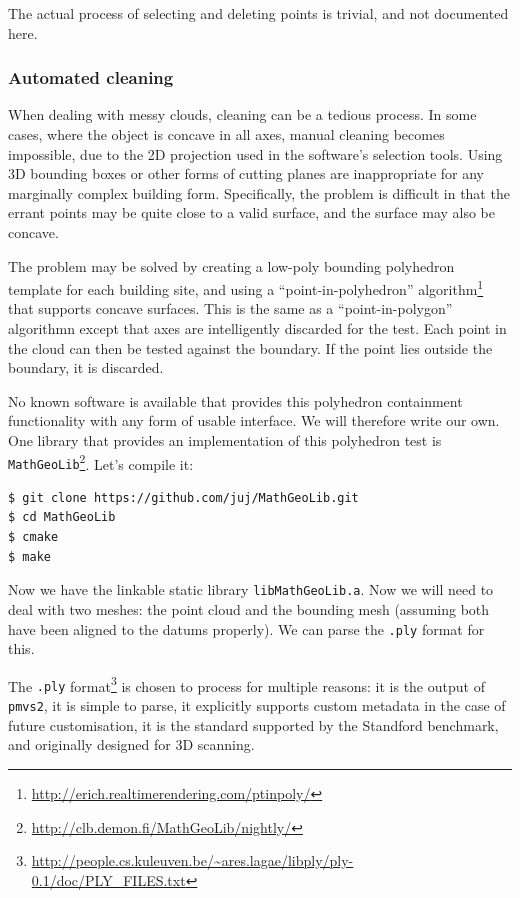 The actual process of selecting and deleting points is trivial, and not documented here.

\subsubsection{Automated cleaning}

When dealing with messy clouds, cleaning can be a tedious process. In some cases, where the object is concave in all axes, manual cleaning becomes impossible, due to the 2D projection used in the software's selection tools. Using 3D bounding boxes or other forms of cutting planes are inappropriate for any marginally complex building form. Specifically, the problem is difficult in that the errant points may be quite close to a valid surface, and the surface may also be concave.

The problem may be solved by creating a low-poly bounding polyhedron template for each building site, and using a ``point-in-polyhedron'' algorithm\footnote{\url{http://erich.realtimerendering.com/ptinpoly/}} that supports concave surfaces. This is the same as a ``point-in-polygon'' algorithmn except that axes are intelligently discarded for the test. Each point in the cloud can then be tested against the boundary. If the point lies outside the boundary, it is discarded.

No known software is available that provides this polyhedron containment functionality with any form of usable interface. We will therefore write our own. One library that provides an implementation of this polyhedron test is {\tt MathGeoLib}\footnote{\url{http://clb.demon.fi/MathGeoLib/nightly/}}. Let's compile it:

\begin{lstlisting}
$ git clone https://github.com/juj/MathGeoLib.git
$ cd MathGeoLib
$ cmake
$ make
\end{lstlisting}

Now we have the linkable static library {\tt libMathGeoLib.a}. Now we will need to deal with two meshes: the point cloud and the bounding mesh (assuming both have been aligned to the datums properly). We can parse the {\tt .ply} format for this.

The {\tt .ply} format\footnote{\url{http://people.cs.kuleuven.be/~ares.lagae/libply/ply-0.1/doc/PLY_FILES.txt}} is chosen to process for multiple reasons: it is the output of {\tt pmvs2}, it is simple to parse, it explicitly supports custom metadata in the case of future customisation, it is the standard supported by the Standford benchmark, and originally designed for 3D scanning.

